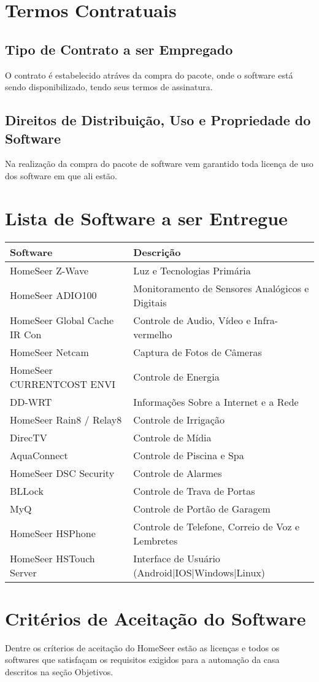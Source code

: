 \section{Termos Contratuais}

\subsection{Tipo de Contrato a ser Empregado}
	O contrato é estabelecido atráves da compra do pacote, onde o software está sendo disponibilizado,
	tendo seus termos de assinatura.

\subsection{Direitos de Distribuição, Uso e Propriedade do Software}
	Na realização da compra do pacote de software vem garantido toda licença de uso dos software em que ali estão.

\section{Lista de Software a ser Entregue}

\begin{tabular}{|l|l|}
	\hline
	\textbf{Software} & \textbf{Descrição}\tabularnewline
	\hline
	\hline
	HomeSeer Z-Wave & Luz e Tecnologias Primária\tabularnewline
	\hline
	HomeSeer ADIO100 & Monitoramento de Sensores Analógicos e Digitais\tabularnewline
	\hline
	HomeSeer Global Cache IR Con & Controle de Audio, Vídeo e Infra-vermelho\tabularnewline
	\hline
	HomeSeer Netcam & Captura de Fotos de Câmeras\tabularnewline
	\hline
	HomeSeer CURRENTCOST ENVI & Controle de Energia\tabularnewline
	\hline
	DD-WRT & Informações Sobre a Internet e a Rede\tabularnewline
	\hline
	HomeSeer Rain8 / Relay8 & Controle de Irrigação\tabularnewline
	\hline
	DirecTV & Controle de Mídia\tabularnewline
	\hline
	AquaConnect & Controle de Piscina e Spa\tabularnewline
	\hline
	HomeSeer DSC Security & Controle de Alarmes\tabularnewline
	\hline
	BLLock & Controle de Trava de Portas\tabularnewline
	\hline
	MyQ & Controle de Portão de Garagem\tabularnewline
	\hline
	HomeSeer HSPhone & Controle de Telefone, Correio de Voz e Lembretes\tabularnewline
	\hline
	HomeSeer HSTouch Server & Interface de Usuário (Android|IOS|Windows|Linux)\tabularnewline
	\hline
\end{tabular}

\section{Critérios de Aceitação do Software}
	Dentre os críterios de aceitação do HomeSeer estão as licenças e todos os softwares que satisfaçam os requisitos
	exigidos para a automação da casa descritos na seção Objetivos.